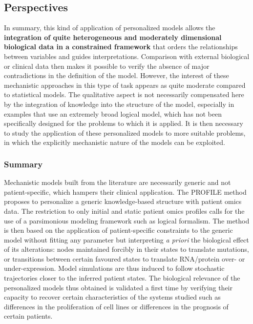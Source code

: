 \documentclass[a4paper,12pt,twoside,onecolumn,openright,final,oldfontcommands]{memoir}
\let\BeginKnitrBlock\begin \let\EndKnitrBlock\end
\begin{document}
\subsection{Perspectives}\label{perspectives}

In summary, this kind of application of personalized models allows the
\textbf{integration of quite heterogeneous and moderately dimensional
biological data in a constrained framework} that orders the
relationships between variables and guides interpretations. Comparison
with external biological or clinical data then makes it possible to
verify the absence of major contradictions in the definition of the
model. However, the interest of these mechanistic approaches in this
type of task appears as quite moderate compared to statistical models.
The qualitative aspect is not necessarily compensated here by the
integration of knowledge into the structure of the model, especially in
examples that use an extremely broad logical model, which has not been
specifically designed for the problems to which it is applied. It is
then necessary to study the application of these personalized models to
more suitable problems, in which the explicitly mechanistic nature of
the models can be exploited.

\BeginKnitrBlock{conclubox}
\subsubsection*{Summary}\label{summary-4}

Mechanistic models built from the literature are necessarily generic and
not patient-specific, which hampers their clinical application. The
PROFILE method proposes to personalize a generic knowledge-based
structure with patient omics data. The restriction to only initial and
static patient omics profiles calls for the use of a parsimonious
modeling framework such as logical formalism. The method is then based
on the application of patient-specific constraints to the generic model
without fitting any parameter but interpreting \emph{a priori} the
biological effect of its alterations: nodes maintained forcibly in their
states to translate mutations, or transitions between certain favoured
states to translate RNA/protein over- or under-expression. Model
simulations are thus induced to follow stochastic trajectories closer to
the inferred patient states. The biological relevance of the
personalized models thus obtained is validated a first time by verifying
their capacity to recover certain characteristics of the systems studied
such as differences in the proliferation of cell lines or differences in
the prognosis of certain patients.
\EndKnitrBlock{conclubox}
\end{document}
